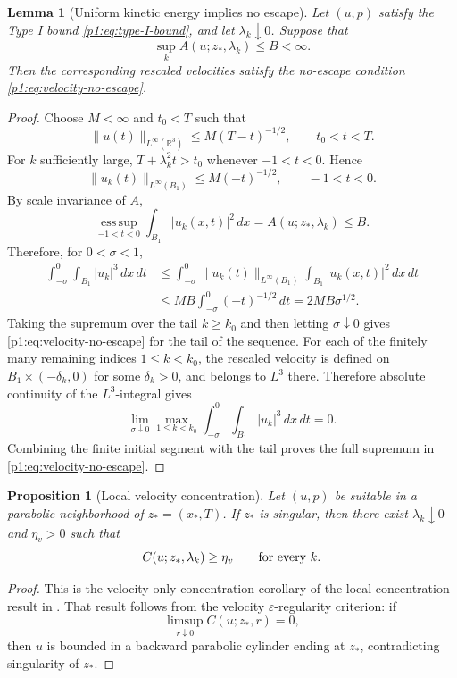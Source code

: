 \documentclass[11pt]{amsart}
\theoremstyle{plain}
\newtheorem{lemma}[lemma]{Lemma}
\newtheorem{proposition}[proposition]{Proposition}
\theoremstyle{definition}
\theoremstyle{remark}
\numberwithin{equation}{section}
\newcommand{\R}{\mathbb R}
\newcommand{\esssup}{\operatorname*{ess\,sup}}
\begin{document}
\begin{lemma}[Uniform kinetic energy implies no escape]
\label{p1:lem:A-seq-no-escape}
Let \((u,p)\) satisfy the Type I bound \eqref{p1:eq:type-I-bound}, and let
\(\lambda_k\downarrow0\).  Suppose that
\[
   \sup_k A(u;z_*,\lambda_k)\le B<\infty .
\]
Then the corresponding rescaled velocities satisfy the no-escape condition
\eqref{p1:eq:velocity-no-escape}.
\end{lemma}

\begin{proof}
Choose \(M<\infty\) and \(t_0<T\) such that
\[
   \|u(t)\|_{L^\infty(\R^3)}
   \le M(T-t)^{-1/2},
   \qquad t_0<t<T.
\]
For \(k\) sufficiently large, \(T+\lambda_k^2t>t_0\) whenever
\(-1<t<0\).  Hence
\[
   \|u_k(t)\|_{L^\infty(B_1)}
   \le M(-t)^{-1/2},\qquad -1<t<0.
\]
By scale invariance of \(A\),
\[
   \esssup_{-1<t<0}\int_{B_1}|u_k(x,t)|^2\,dx
   =
   A(u;z_*,\lambda_k)\le B.
\]
Therefore, for \(0<\sigma<1\),
\[
\begin{aligned}
   \int_{-\sigma}^{0}\int_{B_1}|u_k|^3\,dx\,dt
   &\le
   \int_{-\sigma}^{0}
   \|u_k(t)\|_{L^\infty(B_1)}
   \int_{B_1}|u_k(x,t)|^2\,dx\,dt  \\
   &\le MB\int_{-\sigma}^{0}(-t)^{-1/2}\,dt
    =2MB\sigma^{1/2}.
\end{aligned}
\]
Taking the supremum over the tail \(k\ge k_0\) and then letting
\(\sigma\downarrow0\) gives \eqref{p1:eq:velocity-no-escape} for the tail of the
sequence.  For each of the finitely many remaining indices
\(1\le k<k_0\), the rescaled velocity is defined on
\(B_1\times(-\delta_k,0)\) for some \(\delta_k>0\), and belongs to
\(L^3\) there.  Therefore absolute continuity of the \(L^3\)-integral gives
\[
   \lim_{\sigma\downarrow0}
   \max_{1\le k<k_0}
   \int_{-\sigma}^{0}\int_{B_1}|u_k|^3\,dx\,dt=0.
\]
Combining the finite initial segment with the tail proves the full supremum
in \eqref{p1:eq:velocity-no-escape}.
\end{proof}

\begin{proposition}[Local velocity concentration]
\label{p1:prop:local-velocity-concentration}
Let \((u,p)\) be suitable in a parabolic neighborhood of
\(z_*=(x_*,T)\).  If \(z_*\) is singular, then there exist
\(\lambda_k\downarrow0\) and \(\eta_v>0\) such that
\[
   C(u;z_*,\lambda_k)\ge\eta_v
   \qquad\hbox{for every }k.
\]
\end{proposition}

\begin{proof}
This is the velocity-only concentration corollary of the local concentration
result in .  That result follows from the
velocity \(\varepsilon\)-regularity criterion: if
\[
   \limsup_{r\downarrow0}C(u;z_*,r)=0,
\]
then \(u\) is bounded in a backward parabolic cylinder ending at \(z_*\),
contradicting singularity of \(z_*\).
\end{proof}
\end{document}
